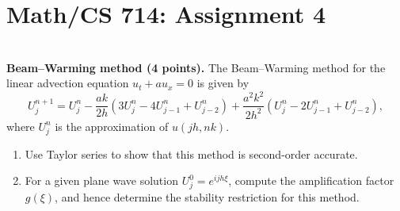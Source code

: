 \documentclass[11pt]{article}
\begin{document}
\section*{Math/CS 714: Assignment 4}

\begin{problem} \\ 
    \textbf{Beam--Warming method (4 points).}
        The Beam--Warming method for the linear advection equation $u_t + au_x =0$
        is given by
        \begin{equation}
          U^{n+1}_j = U^n_j - \frac{ak}{2h} (3 U^n_j - 4U^n_{j-1} + U^n_{j-2} ) +
          \frac{a^2 k^2}{2h^2} (U^n_j - 2U^n_{j-1} + U^n_{j-2}),
          \label{eq:beam_warming}
        \end{equation}
        where $U^n_j$ is the approximation of $u(jh,nk)$.
        \begin{enumerate}
          \item Use Taylor series to show that this method is second-order accurate.
          \item For a given plane wave solution $U^0_j = e^{ij h \xi}$, compute the
                amplification factor $g(\xi)$, and hence determine the stability
                restriction for this method.
        \end{enumerate}
\end{problem}
\end{document}
